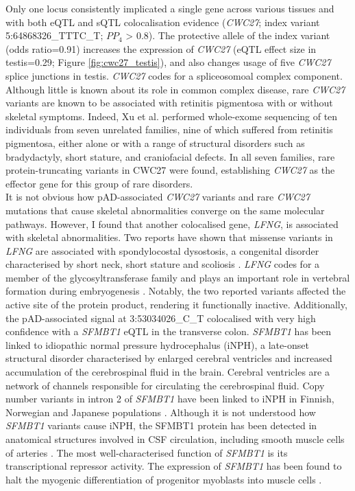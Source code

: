   Only one locus consistently implicated a single gene across various tissues and with both eQTL and sQTL colocalisation evidence (\textit{CWC27}; index variant 5:64868326\_TTTC\_T; $PP_{4}$ > 0.8). The protective allele of the index variant (odds ratio=0.91) increases the expression of \textit{CWC27} (eQTL effect size in testis=0.29; Figure \ref{fig:cwc27_testis}), and also changes usage of five \textit{CWC27} splice junctions in testis. \textit{CWC27} codes for a spliceosomoal complex component. Although little is known about its role in common complex disease, rare \textit{CWC27} variants are known to be associated with retinitis pigmentosa with or without skeletal symptoms. Indeed, Xu et al. \cite{Xu2017-tf} performed whole-exome sequencing of ten individuals from seven unrelated families, nine of which suffered from retinitis pigmentosa, either alone or with a range of structural disorders such as bradydactyly, short stature, and craniofacial defects. In all seven families, rare protein-truncating variants in CWC27 were found, establishing \textit{CWC27} as the effector gene for this group of rare disorders.\\

  It is not obvious how pAD-associated \textit{CWC27} variants and rare \textit{CWC27} mutations that cause skeletal abnormalities converge on the same molecular pathways. However, I found that another colocalised gene, \textit{LFNG}, is associated with skeletal abnormalities. Two reports have shown that missense variants in \textit{LFNG} are associated with spondylocostal dysostosis, a congenital disorder characterised by short neck, short stature and scoliosis \cite{Otomo2019-os,Sparrow2006-vq}. \textit{LFNG} codes for a member of the glycosyltransferase family and plays an important role in vertebral formation during embryogenesis \cite{Serth2003-kn}. Notably, the two reported variants affected the active site of the protein product, rendering it functionally inactive. Additionally, the pAD-associated signal at 3:53034026\_C\_T colocalised with very high confidence with a \textit{SFMBT1} eQTL in the transverse colon. \textit{SFMBT1} has been linked to idiopathic normal pressure hydrocephalus (iNPH), a late-onset structural disorder characterised by enlarged cerebral ventricles and increased accumulation of the cerebrospinal fluid in the brain.  Cerebral ventricles are a network of channels responsible for circulating the cerebrospinal fluid. Copy number variants in intron 2 of \textit{SFMBT1} have been linked to iNPH in Finnish, Norwegian and Japanese populations \cite{Korhonen2018-fc,Sato2016-yj}. Although it is not understood how \textit{SFMBT1} variants cause iNPH, the SFMBT1 protein has been detected in anatomical structures involved in CSF circulation, including smooth muscle cells of arteries \cite{Kato2011-xj}. The most well-characterised function of \textit{SFMBT1} is its transcriptional repressor activity. The expression of \textit{SFMBT1} has been found to halt the myogenic differentiation of progenitor myoblasts into muscle cells \cite{Lin2013-ga}. \\
  
